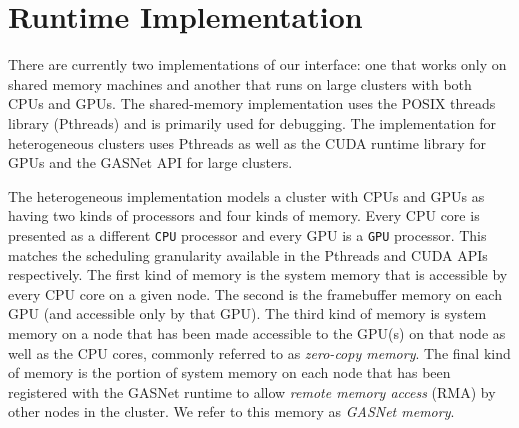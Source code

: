 
\section{Runtime Implementation}
\label{sec:impl}

There are currently two implementations of our interface:
one that works only on shared memory machines and another that
runs on large clusters with both CPUs and GPUs.  The shared-memory
implementation uses the POSIX threads library\cite{PTHREADS} (Pthreads)
and is primarily used for debugging.
The implementation for heterogeneous clusters uses Pthreads as 
well as the CUDA runtime library for GPUs\cite{CUDA} and the GASNet
API for large clusters\cite{GASNET07}.  

The heterogeneous implementation
models a cluster with CPUs and GPUs as having two kinds of processors 
and four kinds of memory.  Every CPU core is presented as a different {\tt CPU} processor
and every GPU is a {\tt GPU} processor.  This matches the scheduling granularity available
in the Pthreads and CUDA APIs respectively.  The first kind of memory is the 
system memory that is accessible by every CPU core on a given node.  The second is the 
framebuffer memory on each GPU (and accessible only by that GPU).  The third kind
of memory is system memory on a node that has been made accessible to the GPU(s) on
that node as well as the CPU cores, commonly referred to as {\em zero-copy memory}.
The final kind of memory is the portion of system memory on each node that has been registered with
the GASNet runtime to allow {\em remote memory access} (RMA) by other nodes in the cluster.
We refer to this memory as {\em GASNet memory}.


